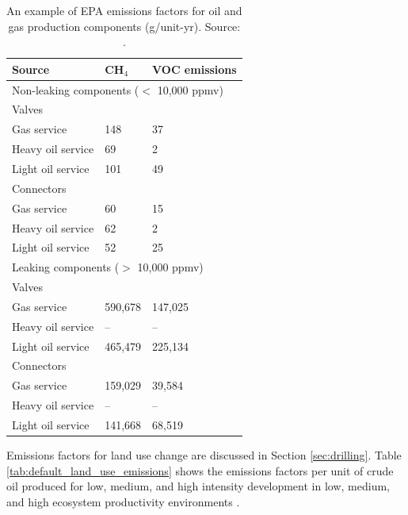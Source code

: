\documentclass[11pt]{report}
\begin{document}
\begin{table}
\begin{scriptsize}
\caption{An example of EPA emissions factors for oil and gas production components (g/unit-yr). Source: \cite{API1996b}.}
\label{tab:EPA_EF_components}
\begin{tabular*}{0.7\columnwidth}{p{}p{}p{}}
\toprule
Source & CH$_{4}$ & VOC emissions \\
\midrule
\multicolumn{3}{p{0.66\columnwidth}}{Non-leaking components ($<$ 10,000 ppmv)} \\
\midrule

Valves & & \\
\quad\quad Gas service & 148 & 37 \\
\quad\quad Heavy oil service & 69 & 2 \\
\quad\quad Light oil service & 101 & 49 \\

Connectors & & \\
\quad\quad Gas service & 60 & 15 \\
\quad\quad Heavy oil service & 62 & 2 \\
\quad\quad Light oil service & 52 & 25 \\

\midrule
\multicolumn{3}{p{0.66\columnwidth}}{Leaking components ($>$ 10,000 ppmv)} \\
\midrule
Valves & & \\
\quad\quad Gas service & 590,678 & 147,025 \\
\quad\quad Heavy oil service & -- & -- \\
\quad\quad Light oil service & 465,479 & 225,134 \\

Connectors & & \\
\quad\quad Gas service & 159,029 & 39,584 \\
\quad\quad Heavy oil service & -- & -- \\
\quad\quad Light oil service & 141,668 & 68,519 \\

\bottomrule
\end{tabular*}
\end{scriptsize}
\end{table}


Emissions factors for land use change are discussed in Section \ref{sec:drilling}. Table \ref{tab:default_land_use_emissions} shows the emissions factors per unit of crude oil produced for low, medium, and high intensity development in low, medium, and high ecosystem productivity environments \cite{Yeh2010}.
\end{document}
